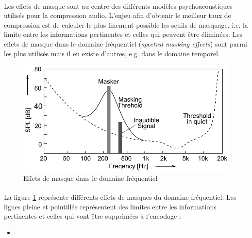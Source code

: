 \documentclass{article}
\begin{document}
    \paragraph{}
    Les effets de masque sont au centre des différents modèles psychoacoustiques utilisés pour la compression audio. L'enjeu afin d'obtenir le meilleur taux de compression est de calculer le plus finement possible les seuils de masquage, i.e. la limite entre les informations pertinentes et celles qui peuvent être éliminées. Les effets de masque dans le domaine fréquentiel (\emph{spectral masking effects}) sont parmi les plus utilisés mais il en existe d'autres, e.g. dans le domaine temporel.
    \begin{figure}[H]
        \centering
        \includegraphics[width=.6\linewidth]{./images/2019-Herre-Dick-masking-effect.png}
        \caption{Effets de masque dans le domaine fréquentiel}
        \label{fig:freq_masking}
    \end{figure}

    \paragraph{}
    La figure \ref{fig:freq_masking} représente différents effets de masques du domaine fréquentiel. Les lignes pleine et pointillée représentent des limites entre les informations pertinentes et celles qui vont être supprimées à l'encodage :
    \begin{itemize}
        \item 
    \end{itemize}

\end{document}
